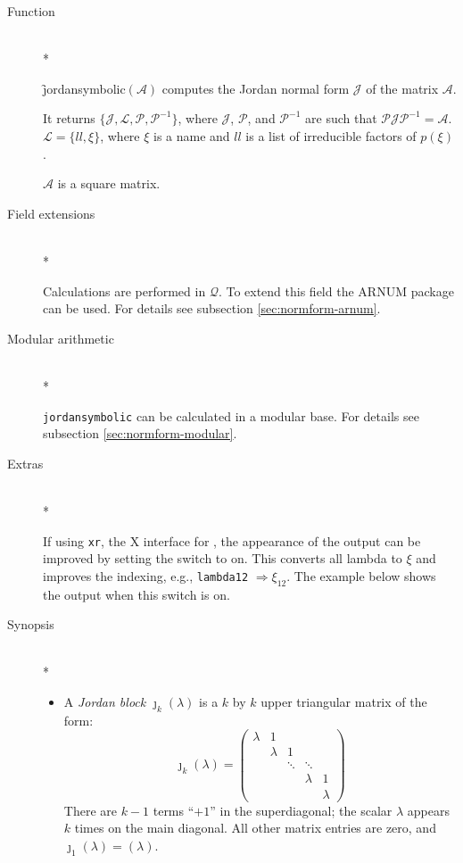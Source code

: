 \begin{description}
\item[Function]\mbox{}\\*

\f{jordansymbolic}$(\mathcal{A})$ computes the Jordan 
normal form $\mathcal{J}$ of the matrix $\mathcal{A}$.

It returns $\{\mathcal{J}, \mathcal{L}, \mathcal{P}, \mathcal{P}^{-1}\}$, where 
$\mathcal{J}$, $\mathcal{P}$, and $\mathcal{P}^{-1}$ are such that $\mathcal{P J P}^
{-1} = \mathcal{A}$. $\mathcal{L} = \{ ll , \xi \}$, where $\xi$ is 
a name and $ll$ is a list of irreducible factors of $p(\xi)$.

$\mathcal{A}$ is a square matrix.

\item[Field extensions]\mbox{}\\*

Calculations are performed in $\mathcal{Q}$. To extend this field the 
{\small ARNUM} package can be used. For details see subsection \ref{sec:normform-arnum}.

\item[Modular arithmetic]\mbox{}\\*

{\tt jordansymbolic} can be calculated in a modular base. For details 
see subsection \ref{sec:normform-modular}.

\item[Extras]\mbox{}\\*

If using \texttt{xr}, the X interface for \REDUCE, the appearance of the 
output can be improved by setting the switch  to on. This 
converts all lambda to $\xi$ and improves the indexing, e.g., \texttt{lambda12} 
$\Rightarrow \xi_{12}$. The example below shows the 
output when this switch is on.

\item[Synopsis]\mbox{}\\*

\begin{itemize}
\item A \emph{Jordan block} ${\jmath}_{k}(\lambda)$ is a $k$ by $k$ 
      upper triangular matrix of the form:
%
      \begin{displaymath}
      {\jmath}_{k}(\lambda) = \begin{pmatrix} \lambda & 1 
      &  &  & \\  &  \lambda & 1  & & \\ & 
      & \ddots & \ddots & \\ &  &  &  \lambda & 1 \\ &
      &  &  & \lambda \end{pmatrix} 
      \end{displaymath}
%     
      There are $k-1$ terms ``$+1$'' in the superdiagonal; the scalar 
      $\lambda$ appears $k$ times on the main diagonal. All other 
      matrix entries are zero, and ${\jmath}_{1}(\lambda) = (\lambda)$.


\end{itemize}
\end{description}
